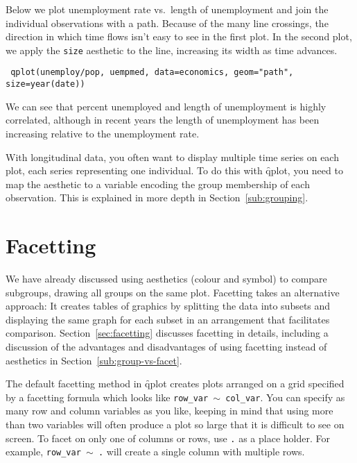 Below we plot unemployment rate vs.\ length of unemployment and join the individual observations with a path.  Because of the many line crossings, the direction in which time flows isn't easy to see in the first plot.  In the second plot, we apply the {\tt size} aesthetic to the line, increasing its width as time advances.

{\tt
qplot(unemploy/pop, uempmed, data=economics, geom="path", size=year(date))
}

We can see that percent unemployed and length of unemployment is highly correlated, although in recent years the length of unemployment has been increasing relative to the unemployment rate.

% 


With longitudinal data, you often want to display multiple time series on each plot, each series representing one individual.  To do this with \f{qplot}, you need to map the  aesthetic to a variable encoding the group membership of each observation. This is explained in more depth in Section~\ref{sub:grouping}.

\section{Facetting}\label{sec:qplot-facetting}

We have already discussed using aesthetics (colour and symbol) to compare subgroups, drawing all groups on the same plot. Facetting takes an alternative approach: It creates tables of graphics by splitting the data into subsets and displaying the same graph for each subset in an arrangement that facilitates comparison. Section~\ref{sec:facetting} discusses facetting in details, including a discussion of the advantages and disadvantages of using facetting instead of aesthetics in Section~\ref{sub:group-vs-facet}.

The default facetting method in \f{qplot} creates plots arranged on a grid specified by a facetting formula which looks like {\tt row\_var $\sim$ col\_var}.  You can specify as many row and column variables as you like, keeping in mind that using more than two variables will often produce a plot so large that it is difficult to see on screen.  To facet on only one of columns or rows, use {\tt .} as a place holder.  For example, {\tt row\_var $\sim$ .} will create a single column with multiple rows.

